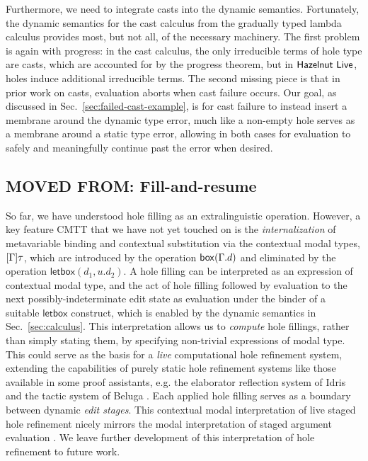 Furthermore, we need to integrate casts into the dynamic semantics. 
Fortunately, the dynamic semantics for the cast calculus from the gradually typed lambda calculus provides most, but not all, of the necessary machinery. 
The first problem is again with progress: in the cast calculus, the only irreducible terms of hole type are casts, which are accounted for by the progress theorem, but in $\textsf{Hazelnut Live}$, holes induce additional irreducible terms. 
The second missing piece is that in prior work on casts, evaluation aborts when cast failure occurs. 
Our goal, as discussed in Sec.~\ref{sec:failed-cast-example}, is for cast failure to instead insert a membrane around the dynamic type error, 
much like a non-empty hole serves as a membrane around a static type error, 
allowing in both cases for evaluation to safely and meaningfully continue past the error when desired.

%
%
\subsection{MOVED FROM: Fill-and-resume}


So far, we have understood hole filling as an extralinguistic operation. 
%
However, a key feature CMTT that we have not yet touched on is the
\emph{internalization} of metavariable binding and contextual
substitution via the contextual modal types, $[\Gamma]\tau$, which
are introduced by the operation $\mathsf{box}(\Gamma.d)$ and
eliminated by the operation $\mathsf{letbox}(d_1, u.d_2)$.
%
A hole filling can be interpreted as an expression of contextual modal
type, and the act of hole filling followed by evaluation to the next
possibly-indeterminate edit state as evaluation under the binder of a
suitable $\mathsf{letbox}$ construct, which is enabled by the dynamic
semantics in Sec.~\ref{sec:calculus}.
%
This interpretation allows us to \emph{compute} hole fillings, rather
than simply stating them, by specifying non-trivial expressions of
modal type.
%
This could serve as the basis for a \emph{live} computational hole
refinement system, extending the capabilities of purely static hole
refinement systems like those available in some proof assistants,
e.g. the elaborator reflection system of Idris
\cite{brady2013idris,DBLP:conf/icfp/ChristiansenB16} and the tactic
system of Beluga
\cite{DBLP:conf/flops/Pientka10,pientka2015inductive}.
%
Each applied hole filling serves as a boundary between dynamic
\emph{edit stages}.
%
This contextual modal interpretation of live staged hole refinement
nicely mirrors the modal interpretation of staged argument evaluation
\cite{Davies:2001op}.
%
We leave further development of this interpretation of hole refinement
to future work.


